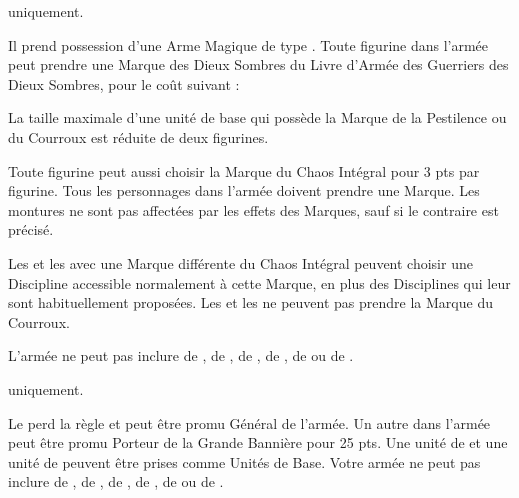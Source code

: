 \begin{multicols}{2}
\startpricelistNSP

\greatkhan{} uniquement.

Il prend possession d'une Arme Magique de type \ironfist{}. Toute figurine dans l'armée peut prendre une Marque des Dieux Sombres du Livre d'Armée des Guerriers des Dieux Sombres, pour le coût suivant :

 La taille maximale d'une unité de base qui possède la Marque de la Pestilence ou du Courroux est réduite de deux figurines.

Toute figurine peut aussi choisir la Marque du Chaos Intégral pour 3 pts par figurine. Tous les personnages dans l'armée doivent prendre une Marque. Les montures ne sont pas affectées par les effets des Marques, sauf si le contraire est précisé.

Les \shamans{} et les \greatshamans{} avec une Marque différente du Chaos Intégral peuvent choisir une Discipline accessible normalement à cette Marque, en plus des Disciplines qui leur sont habituellement proposées. Les \shamans{} et les \greatshamans{} ne peuvent pas prendre la Marque du Courroux.

L'armée ne peut pas inclure de \mammothhunter{}, de \scrapling{}, de \scraplingtrapper{}, de \yeti{}, de \sabretoothtiger{} ou de \scratapult{}.

\vspace*{\fill}\columnbreak
{}\mammothhunter{} uniquement.

Le \mammothhunter{} perd la règle \notaleader{} et peut être promu Général de l'armée. Un autre \mammothhunter{} dans l'armée peut être promu Porteur de la Grande Bannière pour 25 pts. Une unité de \yetis{} et une unité de \sabretoothtigers{} peuvent être prises comme Unités de Base. Votre armée ne peut pas inclure de \greatkhan{}, de \khan{}, de \bruiser{}, de \mercenaryveteran{}, de \bombardier{} ou de \thundercannon{}.


\end{multicols}
